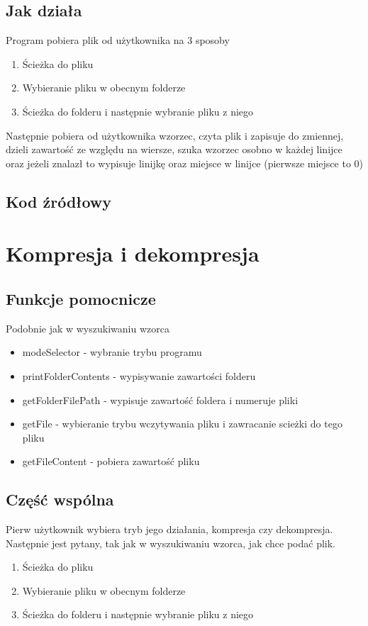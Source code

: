 \documentclass{article}
\begin{document}
\subsection{Jak działa}
Program pobiera plik od użytkownika na 3 sposoby
\begin{enumerate}
    \item Ścieżka do pliku
    \item Wybieranie pliku w obecnym folderze
    \item Ścieżka do folderu i następnie wybranie pliku z niego
\end{enumerate}
Następnie pobiera od użytkownika wzorzec, czyta plik i zapisuje do zmiennej, dzieli zawartość ze względu na wiersze, szuka wzorzec osobno w każdej linijce oraz jeżeli znalazł to wypisuje linijkę oraz miejsce w linijce (pierwsze miejsce to 0) 
\subsection{Kod źródłowy}


\section{Kompresja i dekompresja}
\subsection{Funkcje pomocnicze}
Podobnie jak w wyszukiwaniu wzorca
\begin{itemize}
    \item modeSelector - wybranie trybu programu
    \item printFolderContents - wypisywanie zawartości folderu
    \item getFolderFilePath - wypisuje zawartość foldera i numeruje pliki
    \item getFile - wybieranie trybu wczytywania pliku i zawracanie scieżki do tego pliku
    \item getFileContent - pobiera zawartość pliku 
\end{itemize}
\subsection{Część wspólna}
Pierw użytkownik wybiera tryb jego działania, kompresja czy dekompresja. Następnie jest pytany, tak jak w wyszukiwaniu wzorca, jak chce podać plik.
\begin{enumerate}
    \item Ścieżka do pliku
    \item Wybieranie pliku w obecnym folderze
    \item Ścieżka do folderu i następnie wybranie pliku z niego
\end{enumerate}
\end{document}
